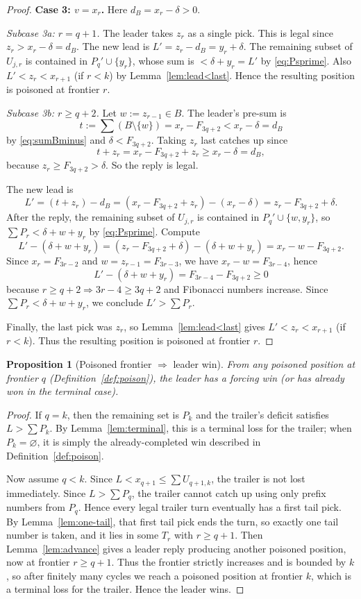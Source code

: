 \documentclass[11pt]{article}
\newtheorem{proposition}[theorem]{Proposition}
\begin{document}
\begin{proof}
\medskip\noindent
\textbf{Case 3: $v=x_r$.}
Here $d_B=x_r-\delta>0$.

\smallskip\noindent
\emph{Subcase 3a: $r=q+1$.}
The leader takes $z_r$ as a single pick. This is legal since $z_r>x_r-\delta=d_B$.
The new lead is $L'=z_r-d_B=y_r+\delta$.
The remaining subset of $U_{j,r}$ is contained in $P_q'\cup\{y_r\}$, whose sum is $<\delta+y_r=L'$ by \eqref{eq:Psprime}.
Also $L'<z_r<x_{r+1}$ (if $r<k$) by Lemma~\ref{lem:lead<last}. Hence the resulting position is poisoned at frontier $r$.

\smallskip\noindent
\emph{Subcase 3b: $r\ge q+2$.}
Let $w:=z_{r-1}\in B$. The leader's pre-sum is
\[
t:=\sum(B\setminus\{w\})=x_r-F_{3q+2}<x_r-\delta=d_B
\]
by \eqref{eq:sumBminus} and $\delta<F_{3q+2}$. Taking $z_r$ last catches up since
\[
t+z_r=x_r-F_{3q+2}+z_r \ge x_r-\delta=d_B,
\]
because $z_r\ge F_{3q+2}>\delta$. So the reply is legal.

The new lead is
\[
L'=(t+z_r)-d_B=(x_r-F_{3q+2}+z_r)-(x_r-\delta)=z_r-F_{3q+2}+\delta.
\]
After the reply, the remaining subset of $U_{j,r}$ is contained in $P_q'\cup\{w,y_r\}$, so $\sum P_r<\delta+w+y_r$ by \eqref{eq:Psprime}.
Compute
\[
L'-(\delta+w+y_r)
= (z_r-F_{3q+2}+\delta)-(\delta+w+y_r)
= x_r-w-F_{3q+2}.
\]
Since $x_r=F_{3r-2}$ and $w=z_{r-1}=F_{3r-3}$, we have $x_r-w=F_{3r-4}$, hence
\[
L'-(\delta+w+y_r)=F_{3r-4}-F_{3q+2}\ge 0
\]
because $r\ge q+2\Rightarrow 3r-4\ge 3q+2$ and Fibonacci numbers increase.
Since $\sum P_r<\delta+w+y_r$, we conclude $L'>\sum P_r$.

Finally, the last pick was $z_r$, so Lemma~\ref{lem:lead<last} gives $L'<z_r<x_{r+1}$ (if $r<k$).
Thus the resulting position is poisoned at frontier $r$.
\end{proof}

\begin{proposition}[Poisoned frontier $\Rightarrow$ leader win]\label{prop:poisonwin}
From any poisoned position at frontier $q$ (Definition~\ref{def:poison}), the leader has a forcing win
(or has already won in the terminal case).
\end{proposition}

\begin{proof}
If $q=k$, then the remaining set is $P_k$ and the trailer's deficit satisfies $L>\sum P_k$.
By Lemma~\ref{lem:terminal}, this is a terminal loss for the trailer; when $P_k=\varnothing$, it is simply the
already-completed win described in Definition~\ref{def:poison}.

Now assume $q<k$. Since $L<x_{q+1}\le \sum U_{q+1,k}$, the trailer is not lost immediately. Since $L>\sum P_q$,
the trailer cannot catch up using only prefix numbers from $P_q$. Hence every legal trailer turn eventually has a first tail pick.
By Lemma~\ref{lem:one-tail}, that first tail pick ends the turn, so exactly one tail number is taken, and it lies in some
$T_r$ with $r\ge q+1$.
Then Lemma~\ref{lem:advance} gives a leader reply producing another poisoned position, now at frontier $r\ge q+1$.
Thus the frontier strictly increases and is bounded by $k$, so after finitely many cycles we reach a poisoned position at frontier $k$,
which is a terminal loss for the trailer. Hence the leader wins.
\end{proof}
\end{document}
